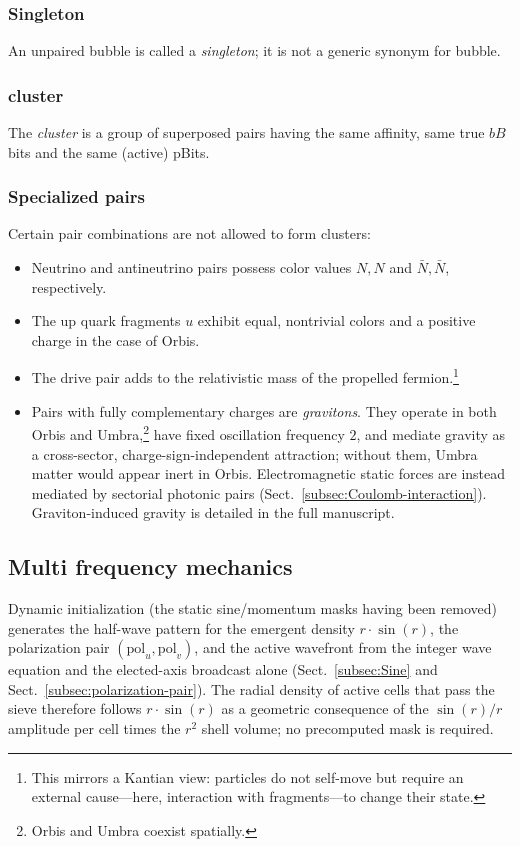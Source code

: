 \documentclass{ijuc}
\begin{document}
\subsubsection{Singleton}
An unpaired bubble is called a \textit{singleton}; it is not a generic synonym for bubble.
\subsubsection{cluster}
The \textit{cluster} is a group of superposed pairs having the same affinity, same true $bB$ bits and the same (active) pBits.
\subsubsection{Specialized pairs} \label{subsec:specialized-pairs}
Certain pair combinations are not allowed to form clusters:
\begin{itemize}
\item Neutrino and antineutrino pairs possess color values $N, N$ and $\bar{N}, \bar{N}$, respectively.
\item The up quark fragments $u$ exhibit equal, nontrivial colors and a positive charge in the case of Orbis.
\item The drive pair adds to the relativistic mass of the propelled fermion.\footnote{This mirrors a Kantian view: particles do not self-move but require an external cause---here, interaction with fragments---to change their state.}
\item Pairs with fully complementary charges are \emph{gravitons}. They operate in both Orbis and Umbra,\footnote{Orbis and Umbra coexist spatially.} have fixed oscillation frequency $2$, and mediate gravity as a cross-sector, charge-sign-independent attraction; without them, Umbra matter would appear inert in Orbis. Electromagnetic static forces are instead mediated by sectorial photonic pairs (Sect.~\ref{subsec:Coulomb-interaction}). Graviton-induced gravity is detailed in the full manuscript.
\end{itemize}

\subsection{Multi frequency mechanics}\label{subsec:multi-frequency}
Dynamic initialization (the static sine/momentum masks having been removed) generates the half-wave pattern for the emergent density $r\cdot\sin(r)$, the polarization pair $(\mathrm{pol}_u,\mathrm{pol}_v)$, and the active wavefront from the integer wave equation and the elected-axis broadcast alone (Sect.~\ref{subsec:Sine} and Sect.~\ref{subsec:polarization-pair}). The radial density of active cells that pass the sieve therefore follows $r\cdot\sin(r)$ as a geometric consequence of the $\sin(r)/r$ amplitude per cell times the $r^{2}$ shell volume; no precomputed mask is required.
\end{document}
